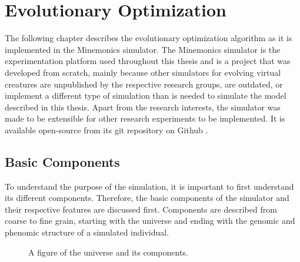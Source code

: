 \documentclass[main]{subfiles}
\begin{document}
\setcounter{chapter}{1}

\chapter{Evolutionary Optimization} %

\label{Chapter\thechapter} %


The following chapter describes the evolutionary optimization algorithm as it is implemented in the Minemonics simulator. %
%
The Minemonics simulator is the experimentation platform used throughout this thesis and is a project that was developed from scratch, mainly because other simulators for evolving virtual creatures are unpublished by the respective research groups, are outdated, or implement a different type of simulation than is needed to simulate the model described in this thesis. %
%
Apart from the research interests, the simulator was made to be extensible for other research experiments to be implemented. %
%
It is available open-source from its git repository on Github \cite{bib:Minemonics2016}.

\section{Basic Components}

To understand the purpose of the simulation, it is important to first understand its different components. %
%
Therefore, the basic components of the simulator and their respective features are discussed first. %
%
Components are described from coarse to fine grain, starting with the universe and ending with the genomic and phenomic structure of a simulated individual.

\begin{figure}[H]
\hspace*{-1.2in}


\caption[A figure of the universe]{A figure of the universe and its components.}
\label{figure:direct-encoding}
\end{figure}
\end{document}

